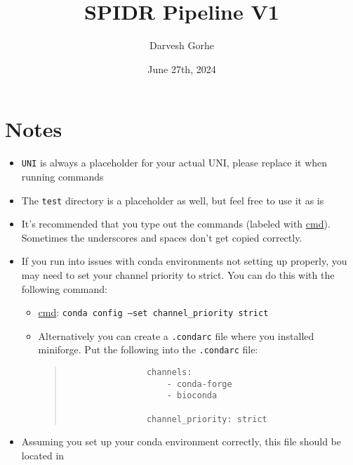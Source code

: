 \documentclass{article}
\author{Darvesh Gorhe}
\title{SPIDR Pipeline V1}
\date{June 27th, 2024}
\newcommand{\UNI}{UNI}
\newcommand{\DIRNAME}{test}
\begin{document}
    \maketitle
    \tableofcontents
    \section{Notes}
    \begin{itemize}
        \item \texttt{\UNI} is always a placeholder for your actual UNI, please replace it when running commands
        \item The \texttt{\DIRNAME} directory is a placeholder as well, but feel free to use it as is
        \item It's recommended that you type out the commands (labeled with \underline{cmd}). Sometimes the underscores and spaces don't get copied correctly.
        \item If you run into issues with conda environments not setting up properly, you may need to set your channel priority to strict. You can do this with the following command:
        \begin{itemize}
            \item \underline{cmd}: \texttt{conda config --set channel\_priority strict}
            \item Alternatively you can create a \texttt{.condarc} file where you installed miniforge. Put the following into the \texttt{.condarc} file:
            \begin{quote}
                \begin{verbatim}
                channels:
                    - conda-forge
                    - bioconda

                channel_priority: strict
                \end{verbatim}
            \end{quote}
        \end{itemize}
        \item Assuming you set up your conda environment correctly, this file should be located in 

    \end{itemize}
\end{document}
